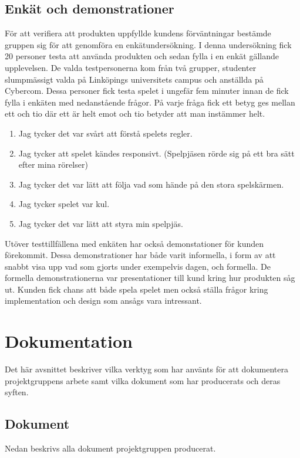 \subsection{Enkät och demonstrationer}
\label{sec:method-poll}
För att verifiera att produkten uppfyllde kundens förväntningar bestämde gruppen sig för att genomföra en enkätundersökning. I denna undersökning fick 20 personer testa att använda produkten och sedan fylla i en enkät gällande upplevelsen. De valda testpersonerna kom från två grupper, studenter slumpmässigt valda på Linköpings universitets campus och anställda på Cybercom. Dessa personer fick testa spelet i ungefär fem minuter innan de fick fylla i enkäten med nedanstående frågor. På varje fråga fick ett betyg ges mellan ett och tio där ett är helt emot och tio betyder att man instämmer helt.


\begin{enumerate}[label={(\alph*)}]
	\item Jag tycker det var svårt att förstå spelets regler.
	\item Jag tycker att spelet kändes responsivt. (Spelpjäsen rörde sig på ett bra sätt efter mina rörelser)
	\item Jag tycker det var lätt att följa vad som hände på den stora spelskärmen.
	\item Jag tycker spelet var kul.
	\item Jag tycker det var lätt att styra min spelpjäs.
\end{enumerate}

Utöver testtillfällena med enkäten har också demonstationer för kunden förekommit. Dessa demonstrationer har både varit informella, i form av att snabbt visa upp vad som gjorts under exempelvis dagen, och formella. De formella demonstrationerna var presentationer till kund kring hur produkten såg ut. Kunden fick chans att både spela spelet men också ställa frågor kring implementation och design som ansågs vara intressant.


\section{Dokumentation}
\label{sec:method-documentation}
Det här avsnittet beskriver vilka verktyg som har använts för att dokumentera projektgruppens arbete samt vilka dokument som har producerats och deras syften.

\subsection{Dokument}
Nedan beskrivs alla dokument projektgruppen producerat.

